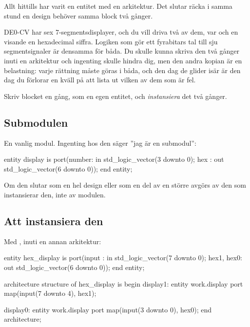 Allt hittills har varit en entitet med en arkitektur. Det slutar räcka i samma stund en design
behöver samma block två gånger.

DE0-CV har sex 7-segmentsdisplayer, och du vill driva två av dem, var och en visande en
hexadecimal siffra. Logiken som gör ett fyrabitars tal till sju segmentsignaler är densamma för
båda. Du skulle kunna skriva den två gånger inuti en arkitektur och ingenting skulle hindra dig,
men den andra kopian är en belastning: varje rättning måste göras i båda, och den dag de glider
isär är den dag du förlorar en kväll på att lista ut vilken av dem som är fel.

Skriv blocket en gång, som en egen entitet, och \emph{instansiera} det två gånger.

\subsection*{Submodulen}
En vanlig modul. Ingenting hos den säger ”jag är en submodul”:

\begin{vhdlcode}
entity display is
    port(number: in  std_logic_vector(3 downto 0);
         hex   : out std_logic_vector(6 downto 0));
end entity;
\end{vhdlcode}

Om den slutar som en hel design eller som en del av en större avgörs av den som instansierar den,
inte av modulen.

\subsection*{Att instansiera den}
Med , inuti en annan arkitektur:

\begin{vhdlcode}
entity hex_display is
    port(input     : in  std_logic_vector(7 downto 0);
         hex1, hex0: out std_logic_vector(6 downto 0));
end entity;

architecture structure of hex_display is
begin
    display1: entity work.display
        port map(input(7 downto 4), hex1);

    display0: entity work.display
        port map(input(3 downto 0), hex0);
end architecture;
\end{vhdlcode}

